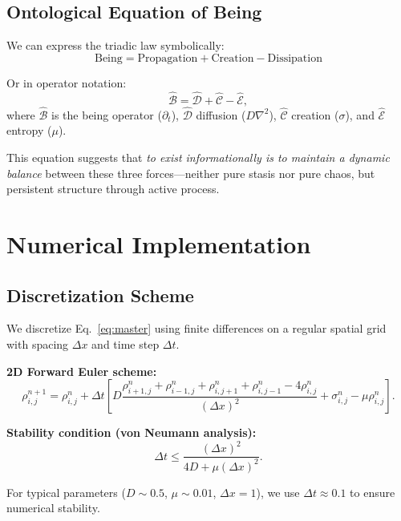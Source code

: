 \documentclass[12pt]{article}
\begin{document}
\subsection{Ontological Equation of Being}

We can express the triadic law symbolically:
\begin{equation}
    \boxed{\text{Being} = \text{Propagation} + \text{Creation} - \text{Dissipation}}
\end{equation}

Or in operator notation:
\begin{equation}
    \hat{\mathcal{B}} = \hat{\mathcal{D}} + \hat{\mathcal{C}} - \hat{\mathcal{E}},
\end{equation}
where $\hat{\mathcal{B}}$ is the being operator ($\partial_t$), $\hat{\mathcal{D}}$ diffusion ($D\nabla^2$), $\hat{\mathcal{C}}$ creation ($\sigma$), and $\hat{\mathcal{E}}$ entropy ($\mu$).

This equation suggests that \emph{to exist informationally is to maintain a dynamic balance} between these three forces---neither pure stasis nor pure chaos, but persistent structure through active process.

\section{Numerical Implementation}

\subsection{Discretization Scheme}

We discretize Eq.~\eqref{eq:master} using finite differences on a regular spatial grid with spacing $\Delta x$ and time step $\Delta t$.

\textbf{2D Forward Euler scheme:}
\begin{equation}
    \rho_{i,j}^{n+1} = \rho_{i,j}^n + \Delta t \left[ D \frac{\rho_{i+1,j}^n + \rho_{i-1,j}^n + \rho_{i,j+1}^n + \rho_{i,j-1}^n - 4\rho_{i,j}^n}{(\Delta x)^2} + \sigma_{i,j}^n - \mu\rho_{i,j}^n \right].
\end{equation}

\textbf{Stability condition (von Neumann analysis):}
\begin{equation}
    \Delta t \leq \frac{(\Delta x)^2}{4D + \mu(\Delta x)^2}.
\end{equation}

For typical parameters ($D \sim 0.5$, $\mu \sim 0.01$, $\Delta x = 1$), we use $\Delta t \approx 0.1$ to ensure numerical stability.
\end{document}
